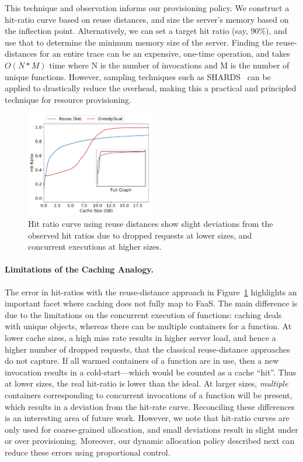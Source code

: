 This technique and observation informs our provisioning policy.
We construct a hit-ratio curve based on reuse distances, and size the server's memory based on the inflection point.
Alternatively, we can set a target hit ratio (say, 90\%), and use that to determine the minimum memory size of the server. 
%
Finding the reuse-distances for an entire trace can be an expensive, one-time operation, and takes $O(N*M)$ time where N is the number of invocations and M is the number of unique functions. 
However, sampling techniques such as SHARDS~\cite{shards} can be applied to drastically reduce the overhead, making this a practical and principled technique for resource provisioning. 



\begin{figure}[t]
  \centering
  \includegraphics[width=0.5\textwidth]{faascache/faas-keepalive-20/graphs/rep-funcs-392/hit-ratio-392-b.pdf}
  \caption{Hit ratio curve using reuse distances show slight deviations from the observed hit ratios due to dropped requests at lower sizes, and concurrent executions at higher sizes.}
  \label{fig:hrc}
\end{figure}

\paragraph{Limitations of the Caching Analogy.}
The error in hit-ratios with the reuse-distance approach in Figure~\ref{fig:hrc} highlights an important facet where caching does not fully map to FaaS.
The main difference is due to the limitations on the concurrent execution of functions: 
caching deals with unique objects, whereas there can be  multiple containers for a function. 
%
At lower cache sizes, a high miss rate results in higher server load, and hence a higher number of dropped requests, that the classical reuse-distance approaches do not capture.
If all warmed containers of a function are in use, then a new invocation results in a cold-start---which would be counted as a cache ``hit''.
Thus at lower sizes, the real hit-ratio is lower than the ideal. 
At larger sizes, \emph{multiple} containers corresponding to concurrent invocations of a function will be present, which results in a deviation from the hit-rate curve. 
Reconciling these differences is an interesting area of future work. %
However, we note that hit-ratio curves are only used for coarse-grained allocation, and small deviations result in slight under or over provisioning. 
Moreover, our dynamic allocation policy described next can reduce these errors using proportional control. 

